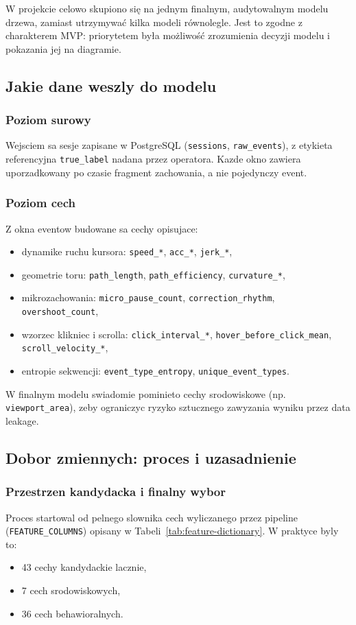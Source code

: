 W projekcie celowo skupiono się na jednym finalnym, audytowalnym modelu drzewa,
zamiast utrzymywać kilka modeli równolegle. Jest to zgodne z charakterem MVP:
priorytetem była możliwość zrozumienia decyzji modelu i pokazania jej na diagramie.

\subsection{Jakie dane weszly do modelu}
\subsubsection{Poziom surowy}
Wejsciem sa sesje zapisane w PostgreSQL (\texttt{sessions}, \texttt{raw\_events}),
z etykieta referencyjna \texttt{true\_label} nadana przez operatora.
Kazde okno zawiera uporzadkowany po czasie fragment zachowania, a nie pojedynczy event.

\subsubsection{Poziom cech}
Z okna eventow budowane sa cechy opisujace:
\begin{itemize}
  \item dynamike ruchu kursora: \texttt{speed\_*}, \texttt{acc\_*}, \texttt{jerk\_*},
  \item geometrie toru: \texttt{path\_length}, \texttt{path\_efficiency}, \texttt{curvature\_*},
  \item mikrozachowania: \texttt{micro\_pause\_count}, \texttt{correction\_rhythm}, \texttt{overshoot\_count},
  \item wzorzec klikniec i scrolla: \texttt{click\_interval\_*}, \texttt{hover\_before\_click\_mean},
  \texttt{scroll\_velocity\_*},
  \item entropie sekwencji: \texttt{event\_type\_entropy}, \texttt{unique\_event\_types}.
\end{itemize}

W finalnym modelu swiadomie pominieto cechy srodowiskowe (np. \texttt{viewport\_area}),
zeby ograniczyc ryzyko sztucznego zawyzania wyniku przez data leakage.

\subsection{Dobor zmiennych: proces i uzasadnienie}
\subsubsection{Przestrzen kandydacka i finalny wybor}
Proces startowal od pelnego slownika cech wyliczanego przez pipeline
(\texttt{FEATURE\_COLUMNS}) opisany w Tabeli~\ref{tab:feature-dictionary}.
W praktyce byly to:
\begin{itemize}
  \item 43 cechy kandydackie lacznie,
  \item 7 cech srodowiskowych,
  \item 36 cech behawioralnych.
\end{itemize}

